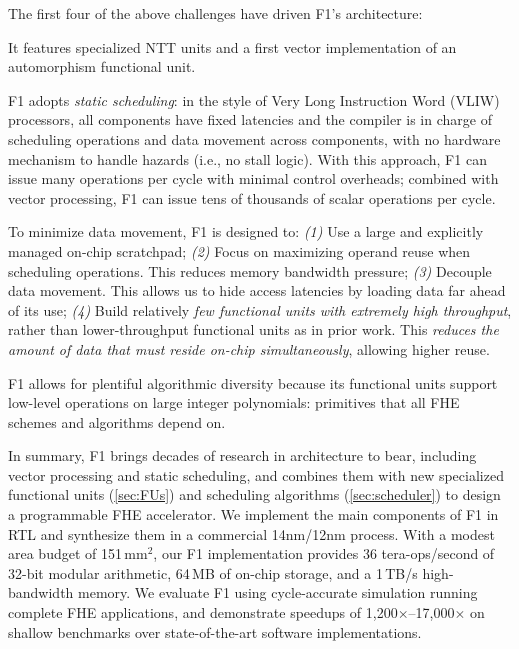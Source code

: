 The first four of the above challenges have driven F1's architecture:
\begin{compactitem}
\item It features specialized NTT units and a first vector implementation of an
    automorphism functional unit.
\item F1 adopts \emph{static scheduling}: in the style of Very Long Instruction
    Word (VLIW) processors, all components have fixed latencies and the
    compiler is in charge of scheduling operations and data movement across
    components, with no hardware mechanism to handle hazards (i.e., no stall
    logic). With this approach, F1 can issue many operations per
    cycle with minimal control overheads; combined with vector processing,
    F1 can issue tens of thousands of scalar operations
    per cycle.
\item To minimize data movement, F1 is designed to: \emph{(1)} Use a large and
    explicitly managed on-chip scratchpad; \emph{(2)} Focus on maximizing operand
    reuse when scheduling operations. This reduces memory bandwidth pressure;
    \emph{(3)} Decouple data movement. This allows us to hide access latencies
    by loading data far ahead of its use; \emph{(4)} Build relatively \emph{few
    functional units with extremely high throughput}, rather than
    lower-throughput functional units as in prior work. This \emph{reduces the
        amount of data that must reside on-chip simultaneously}, allowing
        higher reuse.
\item F1 allows for plentiful algorithmic diversity because its functional
    units support low-level operations on large integer polynomials: primitives
    that all FHE schemes and algorithms depend on.
\end{compactitem}

In summary, F1 brings decades of research in architecture to bear, including
vector processing and static scheduling, and combines them with new specialized
functional units (\autoref{sec:FUs}) and scheduling algorithms
(\autoref{sec:scheduler}) to design a programmable FHE accelerator. We
implement the main components of F1 in RTL and synthesize them in a commercial
14nm/12nm process. With a modest area budget of 151\,mm$^2$, our F1
implementation provides 36 tera-ops/second of 32-bit modular arithmetic, 64\,MB
of on-chip storage, and a 1\,TB/s high-bandwidth memory. We evaluate F1 using
cycle-accurate simulation running complete FHE applications, and demonstrate
speedups of 1,200$\times$--17,000$\times$ on shallow benchmarks over
state-of-the-art software implementations.

